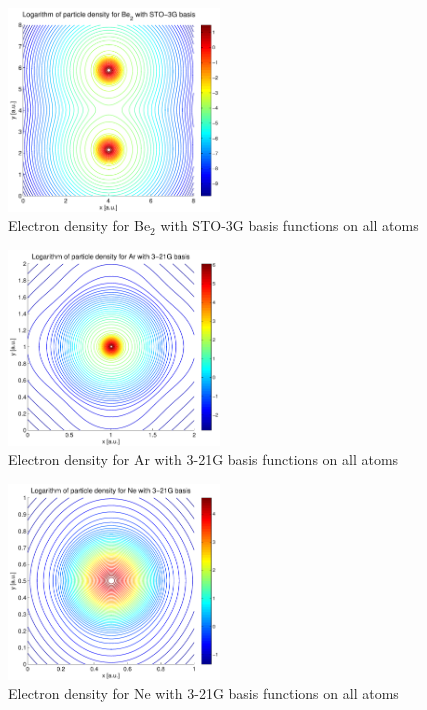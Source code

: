 \documentclass[a4paper,10pt, twocolumn, pre]{revtex4}
\begin{document}
\begin{figure}[h!tb]
\includegraphics[width=0.5\textwidth]{./figures/Be2density_sto3g.pdf}
\caption{Electron density for Be$_2$ with STO-3G basis functions on all atoms}
\end{figure}

\begin{figure}[h!tb]
\includegraphics[width=0.5\textwidth]{./figures/Ardensity_321g.pdf}
\caption{Electron density for Ar with 3-21G basis functions on all atoms}
\end{figure}

\begin{figure}[h!tb]
\includegraphics[width=0.5\textwidth]{./figures/Nedensity_321g.pdf}
\caption{Electron density for Ne with 3-21G basis functions on all atoms}
\end{figure}
\end{document}
